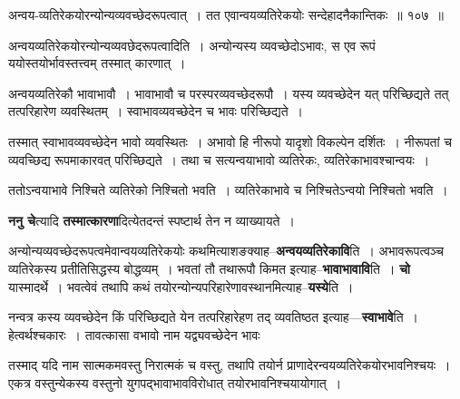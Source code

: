 \documentclass[article,12pt,a4paper]{memoir}
\begin{document}
	  \bigskip
	  \begingroup
	

	  \pstart {}अन्वय-व्यतिरेकयोरन्योन्यव्यवच्छेदरूपत्वात् । तत एवान्वयव्यतिरेकयोः सन्देहादनैकान्तिकः ॥ १०७ ॥
	\pend
      
	  \endgroup
	 

	  \pstart अन्वयव्यतिरेकयोरन्योन्यव्यवछेदरूपत्वादिति । अन्योन्यस्य व्यवच्छेदोऽभावः, स एव रूपं ययोस्तयोर्भावस्तत्त्वम् तस्मात् कारणात् ।
	\pend
        

	  \pstart अन्वयव्यतिरेकौ भावाभावौ । भावाभावौ च परस्परव्यवच्छेदरूपौ । यस्य व्यवच्छेदेन यत् परिच्छिद्यते तत् तत्परिहारेण व्यवस्थितम् । स्वाभावव्यवच्छेदेन च भावः परिच्छिद्यते ।
	\pend
        

	  \pstart तस्मात् स्वाभावव्यवच्छेदेन भावो व्यवस्थितः । अभावो हि नीरूपो यादृशो विकल्पेन दर्शितः । नीरूपतां च व्यवच्छिद्य रूपमाकारवत् परिच्छिद्यते । तथा च सत्यन्वयाभावो व्यतिरेकः, व्यतिरेकाभावश्चान्वयः ।
	\pend
        

	  \pstart ततोऽन्वयाभावे निश्चिते व्यतिरेको निश्चितो भवति । व्यतिरेकाभावे च निश्चितेऽन्वयो निश्चितो भवति ।
	\pend
      
	  \endgroup
	

	  \pstart \textbf{ननु चे}त्यादि \textbf{तस्मात्कारणा}दित्येतदन्तं स्पष्टार्थ तेन न व्याख्यायते ।
	\pend
      

	  \pstart अन्योन्यव्यवच्छेदरूपत्वमेवान्वयव्यतिरेकयोः कथमित्याशङक्याह--\textbf{अन्वयव्यतिरेकावि}ति । अभावरूपत्वञ्च व्यतिरेकस्य प्रतीतिसिद्धस्य बोद्धव्यम् । भवतां तौ तथारूपौ किमत इत्याह--\textbf{भावाभावावि}ति । \textbf{चो} यास्मादर्थे । भवत्वेवं तथापि कथं तयोरन्योन्यपरिहारेणावस्थानमित्याह--\textbf{यस्ये}ति ।
	\pend
      

	  \pstart नन्वत्र कस्य व्यवच्छेदेन किं परिच्छिद्यते येन तत्परिहारेहण तद् व्यवतिष्ठत इत्याह—\textbf{स्वाभावे}ति । हेत्वर्थश्चकारः । तावत्कासा  वभावो नाम यद्व्यवच्छेदेन भावः  \leavevmode{} 
	  
	तस्माद् यदि नाम सात्मकमवस्तु निरात्मकं च वस्तु, तथापि तयोर्न प्राणादेरन्वयव्यतिरेकयोरभावनिश्चयः । एकत्र वस्तुन्येकस्य वस्तुनो युगपद्भावाभावविरोधात् तयोरभावनिश्चयायोगात् ।  
	  
\end{document}
